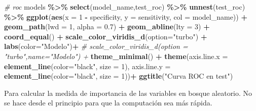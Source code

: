 \documentclass[12pt,a4paper,]{book}
\newenvironment{Shaded}{\begin{snugshade}}{\end{snugshade}}
\newcommand{\AttributeTok}[1]{\textcolor[rgb]{0.13,0.29,0.53}{#1}}
\newcommand{\CommentTok}[1]{\textcolor[rgb]{0.56,0.35,0.01}{\textit{#1}}}
\newcommand{\DecValTok}[1]{\textcolor[rgb]{0.00,0.00,0.81}{#1}}
\newcommand{\FloatTok}[1]{\textcolor[rgb]{0.00,0.00,0.81}{#1}}
\newcommand{\FunctionTok}[1]{\textcolor[rgb]{0.13,0.29,0.53}{\textbf{#1}}}
\newcommand{\NormalTok}[1]{#1}
\newcommand{\SpecialCharTok}[1]{\textcolor[rgb]{0.81,0.36,0.00}{\textbf{#1}}}
\newcommand{\StringTok}[1]{\textcolor[rgb]{0.31,0.60,0.02}{#1}}
\numberwithin{dummy}{section}
\theoremstyle{ocrenumbox}
\theoremstyle{blacknumex}
\theoremstyle{blacknumbox}
\theoremstyle{ocrenum}
\theoremstyle{ocrenum}
\begin{document}
\begin{Shaded}
\begin{Highlighting}[]
\CommentTok{\# roc}
\NormalTok{models }\SpecialCharTok{\%\textgreater{}\%} 
  \FunctionTok{select}\NormalTok{(model\_name,test\_roc) }\SpecialCharTok{\%\textgreater{}\%} 
  \FunctionTok{unnest}\NormalTok{(test\_roc) }\SpecialCharTok{\%\textgreater{}\%} 
  \FunctionTok{ggplot}\NormalTok{(}\FunctionTok{aes}\NormalTok{(}\AttributeTok{x =} \DecValTok{1} \SpecialCharTok{{-}}\NormalTok{ specificity, }\AttributeTok{y =}\NormalTok{ sensitivity, }\AttributeTok{col =}\NormalTok{ model\_name)) }\SpecialCharTok{+} 
  \FunctionTok{geom\_path}\NormalTok{(}\AttributeTok{lwd =} \DecValTok{1}\NormalTok{, }\AttributeTok{alpha =} \FloatTok{0.7}\NormalTok{) }\SpecialCharTok{+}
  \FunctionTok{geom\_abline}\NormalTok{(}\AttributeTok{lty =} \DecValTok{3}\NormalTok{) }\SpecialCharTok{+} 
  \FunctionTok{coord\_equal}\NormalTok{() }\SpecialCharTok{+} 
  \FunctionTok{scale\_color\_viridis\_d}\NormalTok{(}\AttributeTok{option=}\StringTok{"turbo"}\NormalTok{) }\SpecialCharTok{+}
  \FunctionTok{labs}\NormalTok{(}\AttributeTok{color=}\StringTok{"Modelo"}\NormalTok{)}\SpecialCharTok{+}
  \CommentTok{\# scale\_color\_viridis\_d(option = "turbo",name="Modelo") +}
  \FunctionTok{theme\_minimal}\NormalTok{() }\SpecialCharTok{+} 
  \FunctionTok{theme}\NormalTok{(}\AttributeTok{axis.line.x =} \FunctionTok{element\_line}\NormalTok{(}\AttributeTok{color=}\StringTok{"black"}\NormalTok{, }\AttributeTok{size =} \DecValTok{1}\NormalTok{),}
        \AttributeTok{axis.line.y =} \FunctionTok{element\_line}\NormalTok{(}\AttributeTok{color=}\StringTok{"black"}\NormalTok{, }\AttributeTok{size =} \DecValTok{1}\NormalTok{))}\SpecialCharTok{+}
  \FunctionTok{ggtitle}\NormalTok{(}\StringTok{"Curva ROC en test"}\NormalTok{)}
\end{Highlighting}
\end{Shaded}

Para calcular la medida de importancia de las variables en bosque
aleatorio. No se hace desde el principio para que la computación sea más
rápida.
\end{document}
